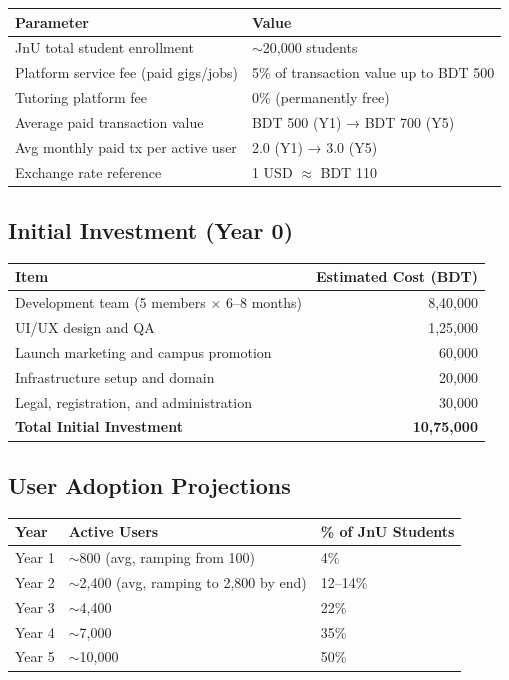 \documentclass[a4paper,12pt]{article}
\begin{document}
\begin{table}[H]
\centering
\begin{tabular}{|l|l|}
\hline
\textbf{Parameter} & \textbf{Value} \\
\hline
JnU total student enrollment & $\sim$20,000 students \\
Platform service fee (paid gigs/jobs) & 5\% of transaction value up to BDT 500 \\
Tutoring platform fee & 0\% (permanently free) \\
Average paid transaction value & BDT 500 (Y1) → BDT 700 (Y5) \\
Avg monthly paid tx per active user & 2.0 (Y1) → 3.0 (Y5) \\
Exchange rate reference & 1 USD $\approx$ BDT 110 \\
\hline
\end{tabular}
\end{table}

\subsection{Initial Investment (Year 0)}

\begin{table}[H]
\centering
\begin{tabular}{|l|r|}
\hline
\textbf{Item} & \textbf{Estimated Cost (BDT)} \\
\hline
Development team (5 members × 6–8 months) & 8,40,000 \\
UI/UX design and QA & 1,25,000 \\
Launch marketing and campus promotion & 60,000 \\
Infrastructure setup and domain & 20,000 \\
Legal, registration, and administration & 30,000 \\
\hline
\textbf{Total Initial Investment} & \textbf{10,75,000} \\
\hline
\end{tabular}
\end{table}

\subsection{User Adoption Projections}

\begin{table}[H]
\centering
\begin{tabular}{|l|l|l|}
\hline
\textbf{Year} & \textbf{Active Users} & \textbf{\% of JnU Students} \\
\hline
Year 1 & $\sim$800 (avg, ramping from 100) & 4\% \\
Year 2 & $\sim$2,400 (avg, ramping to 2,800 by end) & 12--14\% \\
Year 3 & $\sim$4,400 & 22\% \\
Year 4 & $\sim$7,000 & 35\% \\
Year 5 & $\sim$10,000 & 50\% \\
\hline
\end{tabular}
\end{table}
\end{document}
